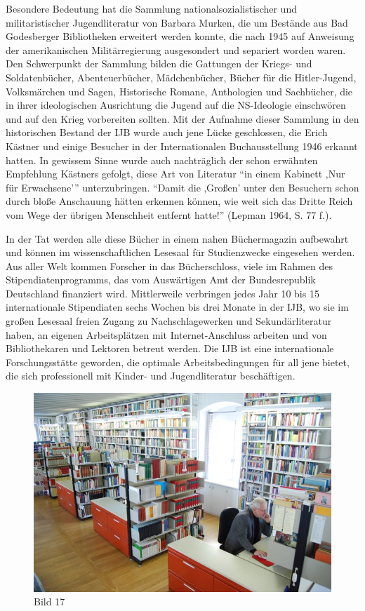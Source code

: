 \documentclass[a4paper,
fontsize=11pt,
oneside,
numbers=noperiodatend,
parskip=half-,
bibliography=totoc,
final
]{scrartcl}
\begin{document}
Besondere Bedeutung hat die Sammlung nationalsozialistischer und
militaristischer Jugendliteratur von Barbara Murken, die um Bestände aus
Bad Godesberger Bibliotheken erweitert werden konnte, die nach 1945 auf
Anweisung der amerikanischen Militärregierung ausgesondert und separiert
worden waren. Den Schwerpunkt der Sammlung bilden die Gattungen der
Kriegs- und Soldatenbücher, Abenteuerbücher, Mädchenbücher, Bücher für
die Hitler-Jugend, Volksmärchen und Sagen, Historische Romane,
Anthologien und Sachbücher, die in ihrer ideologischen Ausrichtung die
Jugend auf die NS-Ideologie einschwören und auf den Krieg vorbereiten
sollten. Mit der Aufnahme dieser Sammlung in den historischen Bestand
der IJB wurde auch jene Lücke geschlossen, die Erich Kästner und einige
Besucher in der Internationalen Buchausstellung 1946 erkannt hatten. In
gewissem Sinne wurde auch nachträglich der schon erwähnten Empfehlung
Kästners gefolgt, diese Art von Literatur \enquote{in einem Kabinett
‚Nur für Erwachsene'} unterzubringen. \enquote{Damit die ‚Großen' unter
den Besuchern schon durch bloße Anschauung hätten erkennen können, wie
weit sich das Dritte Reich vom Wege der übrigen Menschheit entfernt
hatte!} (Lepman 1964, S. 77 f.).~

In der Tat werden alle diese Bücher in einem nahen Büchermagazin
aufbewahrt und können im wissenschaftlichen Lesesaal für Studienzwecke
eingesehen werden. Aus aller Welt kommen Forscher in das Bücherschloss,
viele im Rahmen des Stipendiatenprogramms, das vom Auswärtigen Amt der
Bundesrepublik Deutschland finanziert wird. Mittlerweile verbringen
jedes Jahr 10 bis 15 internationale Stipendiaten sechs Wochen bis drei
Monate in der IJB, wo sie im großen Lesesaal freien Zugang zu
Nachschlagewerken und Sekundärliteratur haben, an eigenen Arbeitsplätzen
mit Internet-Anschluss arbeiten und von Bibliothekaren und Lektoren
betreut werden. Die IJB ist eine internationale Forschungsstätte
geworden, die optimale Arbeitsbedingungen für all jene bietet, die sich
professionell mit Kinder- und Jugendliteratur beschäftigen.~

\begin{figure}[htbp]
\centering
\includegraphics{img/Bild17.jpg}
\caption{Bild 17}
\end{figure}
\end{document}
